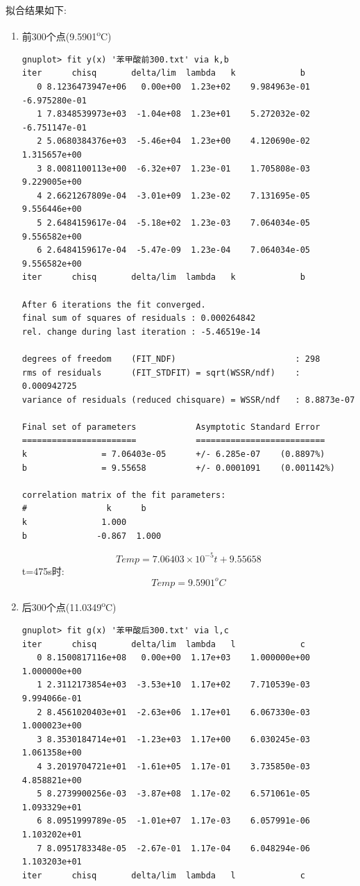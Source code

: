 \documentclass[11pt]{report}
\begin{document}
\begin{enumerate}
拟合结果如下:
\begin{enumerate}
\item 前300个点(9.5901\textsuperscript{o}C)
\label{sec:org0fabb50}
\begin{verbatim}
gnuplot> fit y(x) '苯甲酸前300.txt' via k,b
iter      chisq       delta/lim  lambda   k             b            
   0 8.1236473947e+06   0.00e+00  1.23e+02    9.984963e-01  -6.975280e-01
   1 7.8348539973e+03  -1.04e+08  1.23e+01    5.272032e-02  -6.751147e-01
   2 5.0680384376e+03  -5.46e+04  1.23e+00    4.120690e-02   1.315657e+00
   3 8.0081100113e+00  -6.32e+07  1.23e-01    1.705808e-03   9.229005e+00
   4 2.6621267809e-04  -3.01e+09  1.23e-02    7.131695e-05   9.556446e+00
   5 2.6484159617e-04  -5.18e+02  1.23e-03    7.064034e-05   9.556582e+00
   6 2.6484159617e-04  -5.47e-09  1.23e-04    7.064034e-05   9.556582e+00
iter      chisq       delta/lim  lambda   k             b            

After 6 iterations the fit converged.
final sum of squares of residuals : 0.000264842
rel. change during last iteration : -5.46519e-14

degrees of freedom    (FIT_NDF)                        : 298
rms of residuals      (FIT_STDFIT) = sqrt(WSSR/ndf)    : 0.000942725
variance of residuals (reduced chisquare) = WSSR/ndf   : 8.8873e-07

Final set of parameters            Asymptotic Standard Error
=======================            ==========================
k               = 7.06403e-05      +/- 6.285e-07    (0.8897%)
b               = 9.55658          +/- 0.0001091    (0.001142%)

correlation matrix of the fit parameters:
#                k      b      
k               1.000 
b              -0.867  1.000 

\end{verbatim}
\[
Temp=7.06403\times 10^{-5}t+9.55658
\]
t=475s时:
\[
Temp=9.5901^{o}C
\]
\item 后300个点(11.0349\textsuperscript{o}C)
\label{sec:orge1569ac}
\begin{verbatim}
gnuplot> fit g(x) '苯甲酸后300.txt' via l,c
iter      chisq       delta/lim  lambda   l             c            
   0 8.1500817116e+08   0.00e+00  1.17e+03    1.000000e+00   1.000000e+00
   1 2.3112173854e+03  -3.53e+10  1.17e+02    7.710539e-03   9.994066e-01
   2 8.4561020403e+01  -2.63e+06  1.17e+01    6.067330e-03   1.000023e+00
   3 8.3530184714e+01  -1.23e+03  1.17e+00    6.030245e-03   1.061358e+00
   4 3.2019704721e+01  -1.61e+05  1.17e-01    3.735850e-03   4.858821e+00
   5 8.2739900256e-03  -3.87e+08  1.17e-02    6.571061e-05   1.093329e+01
   6 8.0951999789e-05  -1.01e+07  1.17e-03    6.057991e-06   1.103202e+01
   7 8.0951783348e-05  -2.67e-01  1.17e-04    6.048294e-06   1.103203e+01
iter      chisq       delta/lim  lambda   l             c            


\end{verbatim}
\end{enumerate}
\end{enumerate}
\end{document}
